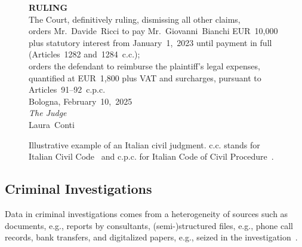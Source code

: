 \begin{figure}[htbp]
\begin{minipage}{0.9\linewidth}
\textbf{RULING}\\
The Court, definitively ruling, dismissing all other claims,\\
orders Mr.~Davide~Ricci to pay Mr.~Giovanni~Bianchi EUR~10,000 plus statutory interest from January~1,~2023 until payment in full (Articles~1282 and~1284~c.c.);\\
orders the defendant to reimburse the plaintiff's legal expenses, quantified at EUR~1,800 plus VAT and surcharges, pursuant to Articles~91--92~c.p.c.\\[0.5em]
Bologna, February~10,~2025\\
\textit{The Judge}\\
Laura~Conti
\end{minipage}
\caption{Illustrative example of an Italian civil judgment. c.c. stands for Italian Civil Code~\cite{CC} and c.p.c. for Italian Code of Civil Procedure~\cite{CPC}.}
\label{fig:civil-judgment-legal-articles}
\end{figure}




\cite{BELLANDI2024,pozzi_wise_2025,aixia_2023,Agazzi2025DAVE,real_batini2021semantic}
\subsection{Criminal Investigations}
Data in criminal investigations comes from a heterogeneity of sources such as documents, e.g., reports by consultants, (semi-)structured files, e.g., phone call records, bank transfers, and digitalized papers, e.g., seized in the investigation~\cite{pozzi_wise_2025}.



